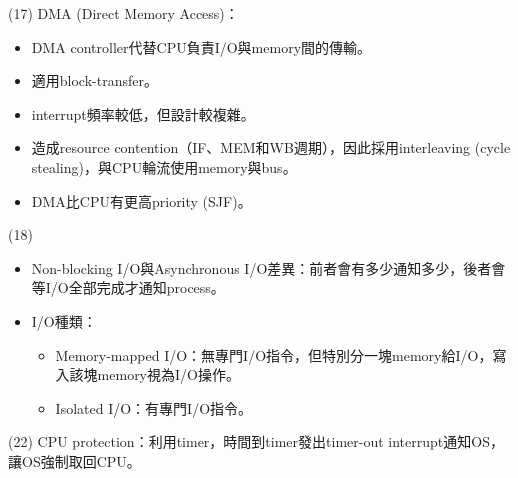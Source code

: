 \begin{theorem}{(17)} DMA (Direct Memory Access)：\begin{itemize}
        \item DMA controller代替CPU負責I/O與memory間的傳輸。
        \item 適用block-transfer。
        \item interrupt頻率較低，但設計較複雜。
        \item 造成resource contention（IF、MEM和WB週期），因此採用interleaving (cycle stealing)，與CPU輪流使用memory與bus。
        \item DMA比CPU有更高priority (SJF)。
    \end{itemize}
\end{theorem}

\begin{theorem}{(18)} \quad\quad \begin{itemize}
        \item Non-blocking I/O與Asynchronous I/O差異：前者會有多少通知多少，後者會等I/O全部完成才通知process。
        \item I/O種類：\begin{itemize}
            \item Memory-mapped I/O：無專門I/O指令，但特別分一塊memory給I/O，寫入該塊memory視為I/O操作。
            \item Isolated I/O：有專門I/O指令。
        \end{itemize}
    \end{itemize}
\end{theorem}

\begin{theorem}{(22)} CPU protection：利用timer，時間到timer發出timer-out interrupt通知OS，讓OS強制取回CPU。
\end{theorem}

